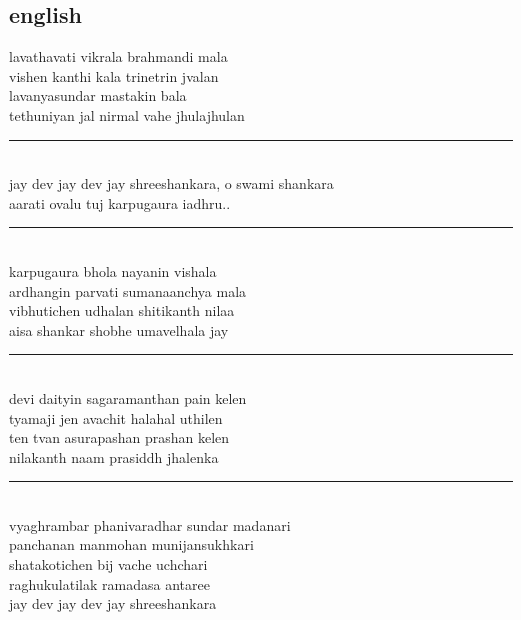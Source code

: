 \documentclass[letterpaper,twocolumn,openany,nodeprecatedcode]{dndbook}
\begin{document}
\begin{flushleft}
  \subsection*{english}
  lavathavati vikrala brahmandi mala \\ vishen kanthi kala trinetrin jvalan \\ lavanyasundar mastakin bala \\ tethuniyan jal nirmal vahe jhulajhulan \\
  \rule{\linewidth}{1pt} \\
  jay dev jay dev jay shreeshankara, o swami shankara \\ aarati ovalu tuj karpugaura iadhru.. \\
  \rule{\linewidth}{1pt} \\
  karpugaura bhola nayanin vishala \\ ardhangin parvati sumanaanchya mala \\ vibhutichen udhalan shitikanth nilaa \\ aisa shankar shobhe umavelhala jay \\
  \rule{\linewidth}{1pt} \\
  devi daityin sagaramanthan pain kelen \\ tyamaji jen avachit halahal uthilen \\ ten tvan asurapashan prashan kelen \\ nilakanth naam prasiddh jhalenka \\
  \rule{\linewidth}{1pt} \\
  vyaghrambar phanivaradhar sundar madanari\\ panchanan manmohan munijansukhkari\\ shatakotichen bij vache uchchari\\ raghukulatilak ramadasa antaree\\ jay dev jay dev jay shreeshankara

\end{flushleft}
\end{document}
